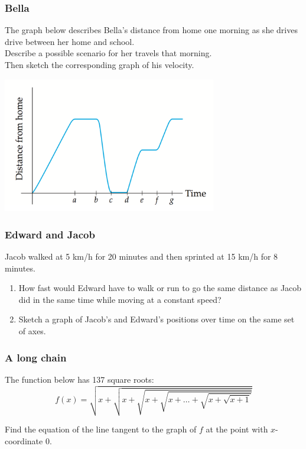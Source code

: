 \documentclass[14pt]{beamer}
\begin{document}
\begin{frame}
\frametitle{Bella}

The graph below describes Bella's distance from home one morning as she drives drive between her home and school.\\

Describe a possible scenario for her travels that morning. \\
Then sketch the corresponding graph of his velocity.

\begin{center}
\includegraphics[width=0.7\textwidth]{G9}
\end{center}

\end{frame}


\begin{frame}
\frametitle{Edward and Jacob}

Jacob walked at 5 km/h for 20 minutes and then sprinted at 15 km/h for 8 minutes.
\begin{enumerate}
\item How fast would Edward have to walk or run to go the same distance as Jacob did in the same time while moving at a constant speed? 
\item Sketch a graph of Jacob's and Edward's positions over time on the same set of axes.
\end{enumerate}

\end{frame}

\begin{frame}[t]
\frametitle{A long chain}

The function below has 137 square roots:
	$$
		f(x) = \sqrt{x+ \sqrt{x + \sqrt{x + \sqrt{x+ \ldots + \sqrt{x + \sqrt{x+1}}}}}}
	$$

Find the equation of the line tangent to the graph of $f$ at the point with $x$-coordinate $0$.
\end{frame}
\end{document}
